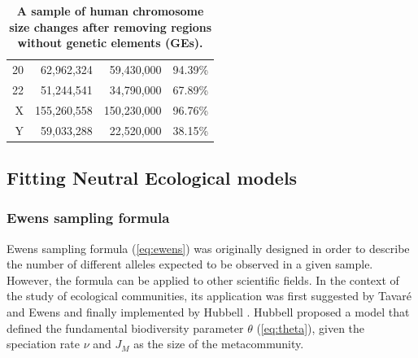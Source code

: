 \begin{table}[!ht]
\begin{center}
\begin{tabular}{ r r r r }
      20           & 62,962,324          & 59,430,000                & 94.39\%                  \\
      22           & 51,244,541          & 34,790,000                & 67.89\%                  \\
      X            & 155,260,558         & 150,230,000               & 96.76\%                  \\
      Y            & 59,033,288          & 22,520,000                & 38.15\%                  \\ \hline
    \end{tabular}
  \end{center}
  \caption[A sample of human chromosome size changes after removing regions without genetic elements (GEs)]{\textbf{A sample of human chromosome size changes after removing regions without genetic elements (GEs).}}
  \label{tab:example_chrom_size}
\end{table}


\subsection{Fitting Neutral Ecological models}
\label{sec:neutr-ecol-models}

\subsubsection{Ewens sampling formula}
\label{sec:ewens-model}

Ewens sampling formula \cite{Ewens1972} (\autoref{eq:ewens}) was originally designed in order to describe the number of different alleles expected to be observed in a given sample. However, the formula can be applied to other scientific fields. In the context of the study of ecological communities, its application was first suggested  by Tavar\'e and Ewens \cite{Tavari1997} and finally implemented by Hubbell \cite{Hubbell2001}. Hubbell proposed a model that defined the fundamental biodiversity parameter $\theta$ (\autoref{eq:theta}), given the speciation rate $\nu$ and $J_M$ as the size of the metacommunity.

